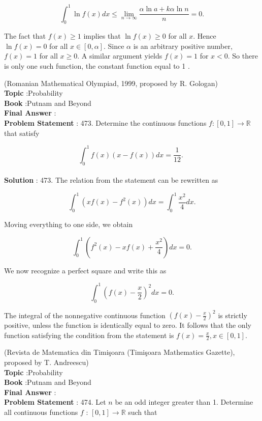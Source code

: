 \documentclass[10pt]{article}
\begin{document}
$$
\int_{0}^{1} \ln f(x) d x \leq \lim _{n \rightarrow \infty} \frac{\alpha \ln a+k \alpha \ln n}{n}=0 .
$$

The fact that $f(x) \geq 1$ implies that $\ln f(x) \geq 0$ for all $x$. Hence $\ln f(x)=0$ for all $x \in[0, \alpha]$. Since $\alpha$ is an arbitrary positive number, $f(x)=1$ for all $x \geq 0$. A similar argument yields $f(x)=1$ for $x<0$. So there is only one such function, the constant function equal to 1 .

(Romanian Mathematical Olympiad, 1999, proposed by R. Gologan)
\\
\textbf{Topic} :Probability\\
\textbf{Book} :Putnam and Beyond\\
\textbf{Final Answer} :\\


\textbf{Problem Statement} :
473. Determine the continuous functions $f:[0,1] \rightarrow \mathbb{R}$ that satisfy

$$
\int_{0}^{1} f(x)(x-f(x)) d x=\frac{1}{12} \text {. }
$$
\\
\textbf{Solution} :
473. The relation from the statement can be rewritten as

$$
\int_{0}^{1}\left(x f(x)-f^{2}(x)\right) d x=\int_{0}^{1} \frac{x^{2}}{4} d x .
$$

Moving everything to one side, we obtain

$$
\int_{0}^{1}\left(f^{2}(x)-x f(x)+\frac{x^{2}}{4}\right) d x=0 .
$$

We now recognize a perfect square and write this as

$$
\int_{0}^{1}\left(f(x)-\frac{x}{2}\right)^{2} d x=0 .
$$

The integral of the nonnegative continuous function $\left(f(x)-\frac{x}{2}\right)^{2}$ is strictly positive, unless the function is identically equal to zero. It follows that the only function satisfying the condition from the statement is $f(x)=\frac{x}{2}, x \in[0,1]$.

(Revista de Matematica din Timişoara (Timişoara Mathematics Gazette), proposed by T. Andreescu)
\\
\textbf{Topic} :Probability\\
\textbf{Book} :Putnam and Beyond\\
\textbf{Final Answer} :\\


\textbf{Problem Statement} :
474. Let $n$ be an odd integer greater than 1. Determine all continuous functions $f$ : $[0,1] \rightarrow \mathbb{R}$ such that
\end{document}

